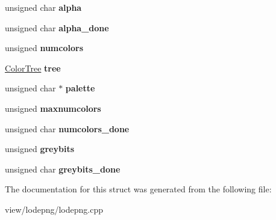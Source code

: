 \begin{DoxyCompactItemize}
\item 
\hypertarget{struct_color_profile_ac2d692c039ecb5974303d8e8240367af}{unsigned char {\bfseries alpha}}\label{struct_color_profile_ac2d692c039ecb5974303d8e8240367af}

\item 
\hypertarget{struct_color_profile_a9c8071d69a1a7a7015f3d880ed9faf8b}{unsigned char {\bfseries alpha\-\_\-done}}\label{struct_color_profile_a9c8071d69a1a7a7015f3d880ed9faf8b}

\item 
\hypertarget{struct_color_profile_ac38cbfa9237ecaf21cb56730c0c15e19}{unsigned {\bfseries numcolors}}\label{struct_color_profile_ac38cbfa9237ecaf21cb56730c0c15e19}

\item 
\hypertarget{struct_color_profile_ad64583d868f74ccd5bda6f94b7bd0a6d}{\hyperlink{struct_color_tree}{Color\-Tree} {\bfseries tree}}\label{struct_color_profile_ad64583d868f74ccd5bda6f94b7bd0a6d}

\item 
\hypertarget{struct_color_profile_acf805bc910a23088e71d4cb04dcaf3df}{unsigned char $\ast$ {\bfseries palette}}\label{struct_color_profile_acf805bc910a23088e71d4cb04dcaf3df}

\item 
\hypertarget{struct_color_profile_a2edd65be07c3c028a58329e570264980}{unsigned {\bfseries maxnumcolors}}\label{struct_color_profile_a2edd65be07c3c028a58329e570264980}

\item 
\hypertarget{struct_color_profile_a7a0f6fe120d02e4573d2c27be20715cb}{unsigned char {\bfseries numcolors\-\_\-done}}\label{struct_color_profile_a7a0f6fe120d02e4573d2c27be20715cb}

\item 
\hypertarget{struct_color_profile_a1a1aefe1c04cff8ede43e12b92429519}{unsigned {\bfseries greybits}}\label{struct_color_profile_a1a1aefe1c04cff8ede43e12b92429519}

\item 
\hypertarget{struct_color_profile_af3825b320146425e402d7ae42bfaa63e}{unsigned char {\bfseries greybits\-\_\-done}}\label{struct_color_profile_af3825b320146425e402d7ae42bfaa63e}

\end{DoxyCompactItemize}


The documentation for this struct was generated from the following file\-:\begin{DoxyCompactItemize}
\item 
view/lodepng/lodepng.\-cpp\end{DoxyCompactItemize}
